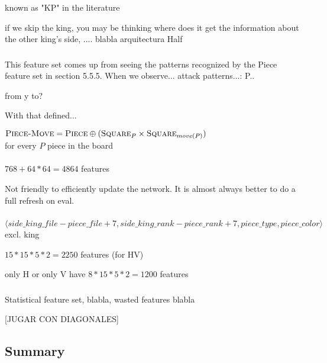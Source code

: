 known as "KP" in the literature

if we skip the king, you may be thinking where does it get the information about the other king's side, .... blabla arquitectura Half

\subsubsection{\mdseries{}}

This feature set comes up from seeing the patterns recognized by the Piece feature set in section 5.5.5. When we observe... attack patterns...:
P..

from y to?

With that defined...

\begin{center}
    $\textsc{Piece-Move} = \textsc{Piece} \oplus (\textsc{Square}_{P} \times \textsc{Square}_{move(P)})$ \\
    for every $P$ piece in the board \\
    ~\\
    $768 + 64*64=4864$ features
\end{center}

Not friendly to efficiently update the network. It is almost always better to do a full refresh on eval.


\subsubsection{\mdseries{}}


$\langle side\_king\_file - piece\_file + 7, side\_king\_rank - piece\_rank + 7, piece\_type, piece\_color \rangle$ excl. king

$15*15*5*2=2250$ features (for HV)

only H or only V have $8*15*5*2=1200$ features


\subsubsection{\mdseries{}}

Statistical feature set, blabla, wasted features blabla

[JUGAR CON DIAGONALES]

\subsection{Summary}

